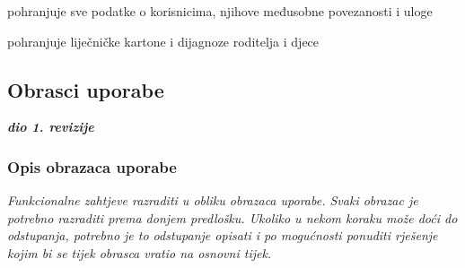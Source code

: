 \begin{packed_enum}
\begin{packed_enum}
				\end{packed_enum}
				
				\item  {}
				
				\begin{packed_enum}
					
					\item pohranjuje sve podatke o korisnicima, njihove međusobne povezanosti i uloge
					\item pohranjuje liječničke kartone i dijagnoze roditelja i djece
					
				\end{packed_enum}
				
			\end{packed_enum}
			
			\eject 
			
			
				
			\subsection{Obrasci uporabe}
				
				\textbf{\textit{dio 1. revizije}}
				
				\subsubsection{Opis obrazaca uporabe}
					\textit{Funkcionalne zahtjeve razraditi u obliku obrazaca uporabe. Svaki obrazac je potrebno razraditi prema donjem predlošku. Ukoliko u nekom koraku može doći do odstupanja, potrebno je to odstupanje opisati i po mogućnosti ponuditi rješenje kojim bi se tijek obrasca vratio na osnovni tijek.}\\
					

